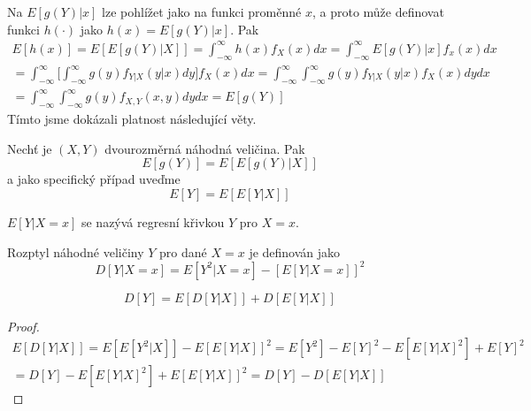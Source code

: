 Na $E[g(Y)|x]$ lze pohlížet jako na funkci proměnné $x$, a proto může definovat funkci $h(\cdot)$ jako $h(x) = E[g(Y)|x]$. Pak
\begin{gather*}
E[h(x)] = E[E[g(Y)|X]] = \int_{-\infty}^{\infty} h(x) f_X(x)dx = \int_{-\infty}^{\infty} E[g(Y)|x]f_x(x)dx\\
= \int_{-\infty}^{\infty} \Big[\int_{-\infty}^{\infty} g(y)f_{Y|X}(y|x)dy\Big]f_X(x)dx = \int_{-\infty}^{\infty} \int_{-\infty}^{\infty} g(y) f_{Y|X}(y|x)f_X(x)dydx\\
=  \int_{-\infty}^{\infty} \int_{-\infty}^{\infty} g(y)f_{X,Y}(x,y)dydx = E[g(Y)] 
\end{gather*}
Tímto jsme dokázali platnost následující věty.

\begin{theorem}
Nechť je $(X,Y)$ dvourozměrná náhodná veličina. Pak
\begin{equation*}
E[g(Y)] = E[E[g(Y)|X]]
\end{equation*}
a jako specifický případ uveďme
\begin{equation*}
E[Y] = E[E[Y|X]]
\end{equation*}
\end{theorem}

\begin{definition}
$E[Y | X = x]$ se nazývá regresní křivkou $Y$ pro $X = x$.
\end{definition}

\begin{definition}
Rozptyl náhodné veličiny $Y$ pro dané $X = x$ je definován jako
\begin{equation*}
D[Y|X = x] = E[Y^2 | X = x] - [E[Y|X = x]]^2
\end{equation*}
\end{definition}

\begin{theorem}
\begin{equation*}
D[Y] = E[D[Y|X]] + D[E[Y|X]]
\end{equation*}
\end{theorem}

\begin{proof}
\begin{gather*}
E[D[Y|X]] = E[E[Y^2|X]] - E[E[Y|X]]^2 = E[Y^2] - E[Y]^2 - E[E[Y|X]^2] + E[Y]^2\\
= D[Y] - E[E[Y|X]^2] + E[E[Y|X]]^2 = D[Y] - D[E[Y|X]]
\end{gather*}
\end{proof}

